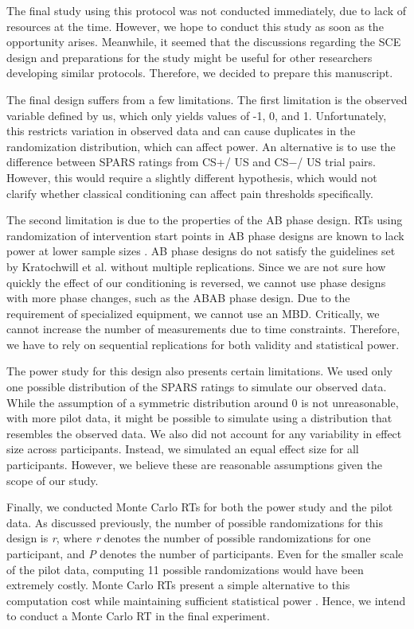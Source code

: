 \documentclass{jote-article}
\begin{document}
The final study using this protocol was not conducted immediately, due to lack of resources at the time. However, we hope to conduct this study as soon as the opportunity arises. Meanwhile, it seemed that the discussions regarding the SCE design and preparations for the study might be useful for other researchers developing similar protocols. Therefore, we decided to prepare this manuscript.

The final design suffers from a few limitations. The first limitation is the observed variable defined by us, which only yields values of -1, 0, and 1. Unfortunately, this restricts variation in observed data and can cause duplicates in the randomization distribution, which can affect power. An alternative is to use the difference between SPARS ratings from CS+/ US and CS−/ US trial pairs. However, this would require a slightly different hypothesis, which would not clarify whether classical conditioning can affect pain thresholds specifically.

The second limitation is due to the properties of the AB phase design. RTs using randomization of intervention start points in AB phase designs are known to lack power at lower sample sizes \cite{bibr46}. AB phase designs do not satisfy the guidelines set by Kratochwill et al. \cite{bibr26} without multiple replications. Since we are not sure how quickly the effect of our conditioning is reversed, we cannot use phase designs with more phase changes, such as the ABAB phase design. Due to the requirement of specialized equipment, we cannot use an MBD. Critically, we cannot increase the number of measurements due to time constraints. Therefore, we have to rely on sequential replications for both validity and statistical power.

The power study for this design also presents certain limitations. We used only one possible distribution of the SPARS ratings to simulate our observed data. While the assumption of a symmetric distribution around 0 is not unreasonable, with more pilot data, it might be possible to simulate using a distribution that resembles the observed data. We also did not account for any variability in effect size across participants. Instead, we simulated an equal effect size for all participants. However, we believe these are reasonable assumptions given the scope of our study.

Finally, we conducted Monte Carlo RTs for both the power study and the pilot data. As discussed previously, the number of possible randomizations for this design is \emph{r}, where \emph{r} denotes the number of possible randomizations for one participant, and \emph{P} denotes the number of participants. Even for the smaller scale of the pilot data, computing 11 possible randomizations would have been extremely costly. Monte Carlo RTs present a simple alternative to this computation cost while maintaining sufficient statistical power \cite{bibr49} \cite{bibr50}. Hence, we intend to conduct a Monte Carlo RT in the final experiment.
\end{document}
